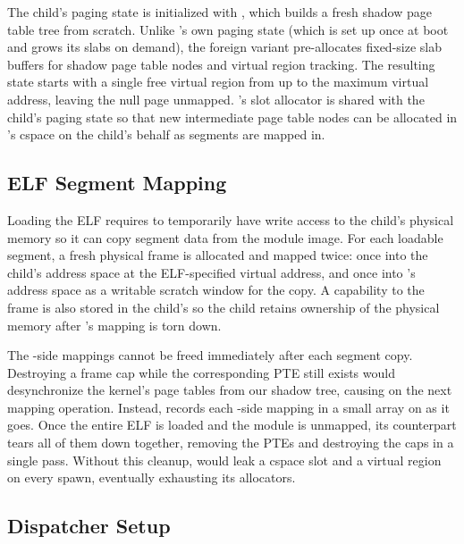 \medskip\noindent
The child's paging state is initialized with ,
which builds a fresh shadow page table tree from scratch. Unlike 's own paging
state (which is set up once at boot and grows its slabs on demand), the foreign
variant pre-allocates fixed-size slab buffers for shadow page table nodes and
virtual region tracking. The resulting state starts with a single free virtual
region from  up to the maximum virtual address, leaving the
null page unmapped. 's slot allocator is shared with the child's paging
state so that new intermediate page table nodes can be allocated in 's
cspace on the child's behalf as segments are mapped in.

\subsection{ELF Segment Mapping}

Loading the ELF requires  to temporarily have write access to the
child's physical memory so it can copy segment data from the module image. For
each loadable segment, a fresh physical frame is allocated and mapped twice: once
into the child's address space at the ELF-specified virtual address, and once
into 's address space as a writable scratch window for the copy. A
capability to the frame is also stored in the child's  so the child
retains ownership of the physical memory after 's mapping is torn down.

\medskip\noindent
The -side mappings cannot be freed immediately after each segment copy.
Destroying a frame cap while the corresponding PTE still exists would
desynchronize the kernel's page tables from our shadow tree, causing
 on the next mapping operation. Instead,
 records each -side mapping in a small array
on  as it goes. Once the entire ELF is loaded and the module is
unmapped, its counterpart  tears all of them
down together, removing the PTEs and destroying the caps in a single pass.
Without this cleanup,  would leak a cspace slot and a virtual region on
every spawn, eventually exhausting its allocators.

\subsection{Dispatcher Setup}

